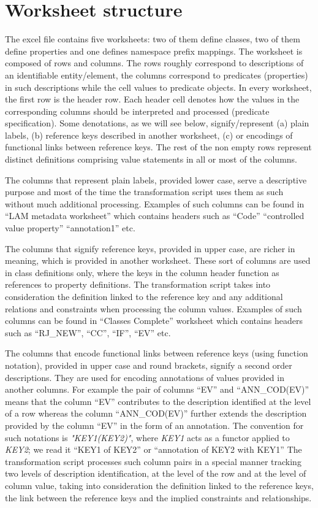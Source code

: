 \section{Worksheet structure}

The excel file contains five worksheets: two of them define classes, two
of them define properties and one defines namespace prefix mappings. The
worksheet is composed of rows and columns. The rows roughly correspond
to descriptions of an identifiable entity/element, the columns
correspond to predicates (properties) in such descriptions while the
cell values to predicate objects. In every worksheet, the first row is
the header row. Each header cell denotes how the values in the
corresponding columns should be interpreted and processed (predicate
specification). Some denotations, as we will see below,
signify/represent (a) plain labels, (b) reference keys described in
another worksheet, (c) or encodings of functional links between
reference keys. The rest of the non empty rows represent distinct
definitions comprising value statements in all or most of the columns.

The columns that represent plain labels, provided lower case, serve a
descriptive purpose and most of the time the transformation script uses
them as such without much additional processing. Examples of such
columns can be found in ``LAM metadata worksheet'' which contains headers
such as ``Code''  ``controlled value property''  ``annotation1'' etc.

The columns that signify reference keys, provided in upper case, are
richer in meaning, which is provided in another worksheet. These sort of
columns are used in class definitions only, where the keys in the column
header function as references to property definitions. The
transformation script takes into consideration the definition linked to
the reference key and any additional relations and constraints when
processing the column values. Examples of such columns can be found in
 ``Classes Complete'' worksheet which contains headers such as ``RJ\_NEW'', ``CC'',  ``IF'',  ``EV'' etc.

The columns that encode functional links between reference keys (using
function notation), provided in upper case and round brackets, signify a
second order descriptions. They are used for encoding annotations of
values provided in another columns. For example the pair of columns ``EV'' and ``ANN\_COD(EV)'' means that the column ``EV'' contributes to the
description identified at the level of a row whereas the column
 ``ANN\_COD(EV)'' further extends the description provided by the column
 ``EV'' in the form of an annotation. The convention for such notations is
\emph{"KEY1(KEY2)"}, where \emph{KEY1} acts as a functor applied to
\emph{KEY2}; we read it ``KEY1 of KEY2'' or ``annotation of KEY2 with
KEY1''  The transformation script processes such column pairs in a
special manner tracking two levels of description identification, at the
level of the row and at the level of column value, taking into
consideration the definition linked to the reference keys, the link
between the reference keys and the implied constraints and
relationships.

